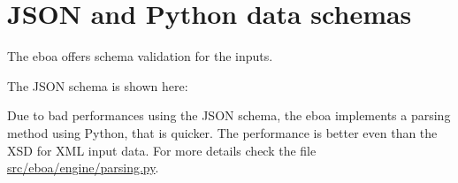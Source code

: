 \chapter{JSON and Python data schemas}\label{ap:json_schema}

The \acrshort{eboa} offers schema validation for the inputs. 

The JSON schema is shown here:



Due to bad performances using the JSON schema, the \acrshort{eboa} implements a parsing method using Python, that is quicker. The performance is better even than the XSD for XML input data. For more details check the file \href{https://bitbucket.org/dbrosnan/eboa/src/master/src/eboa/engine/parsing.py}{src/eboa/engine/parsing.py}.
